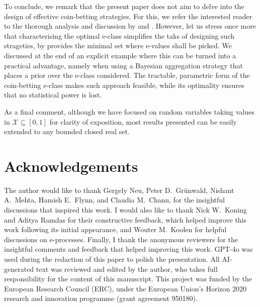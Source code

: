 \documentclass[3p, authoryear, 10pt]{elsarticle}%
\newcommand{\X}{\mathcal X}
\begin{document}
To conclude, we remark that the present paper does not aim to delve into the design of effective coin-betting strategies. For this, we refer the interested reader to the thorough analysis and discussion by \cite{orabona2023tight} and \cite{waudbysmith23estimating}. However, let us stress once more that characterising the optimal e-class simplifies the taks of designing such strageties, by provides the minimal set where e-values shall be picked. We discussed at the end of  an explicit example where this can be turned into a practical advantage, namely when using a Bayesian aggregation strategy that places a prior over the e-class considered. The tractable, parametric form of the coin-betting e-class makes such approach feasible, while its optimality ensures that no statistical power is lost.

As a final comment, although we have focused on random variables taking values in $\X\subseteq [0,1]$ for clarity of exposition, most results presented can be easily extended to any bounded closed real set. 

\section*{Acknowledgements} 
The author would like to thank Gergely Neu, Peter D.~Gr\"unwald, Nishant A.~Mehta, Hamish E.~Flynn, and Claudia M.~Chanu, for the insightful discussions that inspired this work. I would also like to thank Nick W.~Koning and Aditya Ramdas for their constructive feedback, which helped improve this work following its initial appearance, and Wouter M.~Koolen for helpful discussions on e-processes. Finally, I thank the anonymous reviewers for the insightful comments and feedback that helped improving this work. GPT-4o was used during the redaction of this paper to polish the presentation. All AI-generated text was reviewed and edited by the author, who takes full responsibility for the content of this manuscript. This project was funded by the European Research Council (ERC), under the European Union’s Horizon 2020 research and innovation programme (grant agreement 950180). 


\newpage
\appendix
\section{}
\end{document}
